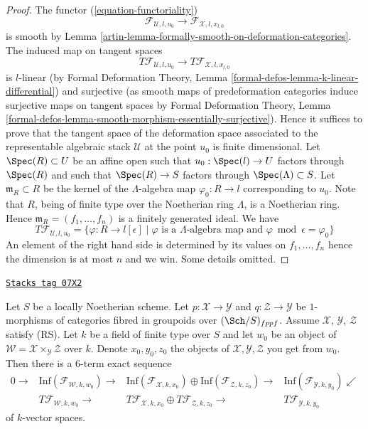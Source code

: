 \begin{proof}
\medskip\noindent
The functor (\ref{equation-functoriality})
$$
\mathcal{F}_{\mathcal{U}, l, u_0}
\longrightarrow
\mathcal{F}_{\mathcal{X}, l, x_{l, 0}}
$$
is smooth by Lemma \ref{artin-lemma-formally-smooth-on-deformation-categories}.
The induced map on tangent spaces
$$
T\mathcal{F}_{\mathcal{U}, l, u_0}
\longrightarrow
T\mathcal{F}_{\mathcal{X}, l, x_{l, 0}}
$$
is $l$-linear (by
Formal Deformation Theory, Lemma
\ref{formal-defos-lemma-k-linear-differential})
and surjective (as smooth maps of predeformation categories induce
surjective maps on tangent spaces by
Formal Deformation Theory, Lemma
\ref{formal-defos-lemma-smooth-morphism-essentially-surjective}).
Hence it suffices to prove that the tangent space of the deformation
space associated to the representable algebraic stack $\mathcal{U}$
at the point $u_0$ is finite dimensional. Let $\Spec(R) \subset U$ be
an affine open such that $u_0 : \Spec(l) \to U$ factors through $\Spec(R)$
and such that $\Spec(R) \to S$ factors through $\Spec(\Lambda) \subset S$.
Let $\mathfrak m_R \subset R$ be the kernel of the $\Lambda$-algebra map
$\varphi_0 : R \to l$ corresponding to $u_0$. Note that $R$, being of finite
type over the Noetherian ring $\Lambda$, is a Noetherian ring. Hence
$\mathfrak m_R = (f_1, \ldots, f_n)$ is a finitely generated ideal.
We have
$$
T\mathcal{F}_{\mathcal{U}, l, u_0}
=
\{\varphi : R \to l[\epsilon] \mid
\varphi \text{ is a } \Lambda\text{-algebra map and }
\varphi \bmod \epsilon = \varphi_0\}
$$
An element of the right hand side is determined by its values on
$f_1, \ldots, f_n$ hence the dimension is at most $n$ and we win.
Some details omitted.
\end{proof}

\begin{lemma}
\label{artin-lemma-fibre-product-tangent-spaces}
\href{https://stacks.math.columbia.edu/tag/07X2}{\texttt{Stacks tag 07X2}}

Let $S$ be a locally Noetherian scheme. Let $p : \mathcal{X} \to \mathcal{Y}$
and $q : \mathcal{Z} \to \mathcal{Y}$ be $1$-morphisms of categories
fibred in groupoids over $(\Sch/S)_{fppf}$. Assume $\mathcal{X}$,
$\mathcal{Y}$, $\mathcal{Z}$ satisfy (RS).
Let $k$ be a field of finite type over $S$ and let $w_0$ be an object of
$\mathcal{W} = \mathcal{X} \times_\mathcal{Y} \mathcal{Z}$ over $k$.
Denote $x_0, y_0, z_0$ the objects of $\mathcal{X}, \mathcal{Y}, \mathcal{Z}$
you get from $w_0$. Then there is a $6$-term exact sequence
$$
\begin{array}{cccc}0 \longrightarrow & \text{Inf}(\mathcal{F}_{\mathcal{W}, k, w_0}) \longrightarrow & \text{Inf}(\mathcal{F}_{\mathcal{X}, k, x_0}) \oplus
\text{Inf}(\mathcal{F}_{\mathcal{Z}, k, z_0}) \longrightarrow & \text{Inf}(\mathcal{F}_{\mathcal{Y}, k, y_0}) \swarrow \\  & T\mathcal{F}_{\mathcal{W}, k, w_0} \longrightarrow & T\mathcal{F}_{\mathcal{X}, k, x_0} \oplus
T\mathcal{F}_{\mathcal{Z}, k, z_0} \longrightarrow & T\mathcal{F}_{\mathcal{Y}, k, y_0}\end{array}
$$
of $k$-vector spaces.
\end{lemma}

